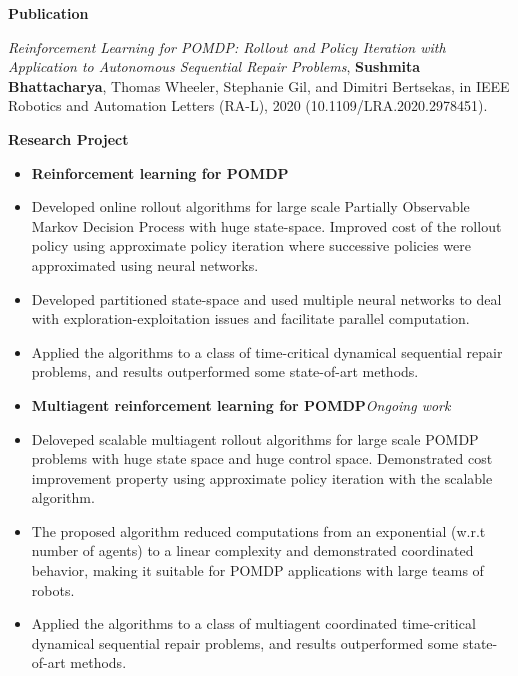 \documentclass[a4paper,11pt]{article}
\newcommand{\resheading}[1]{{\small \colorbox{mygrey}{\begin{minipage}{0.975\textwidth}{\textbf{#1 \vphantom{p\^{E}}}}\end{minipage}}}}
\begin{document}
	
	
	
	\resheading{\textbf{\large Publication}}
	\begin{description}
		\item \hspace{0.65 cm} \textit{Reinforcement Learning for POMDP: Rollout and Policy Iteration with Application to Autonomous Sequential Repair Problems}, \textbf{Sushmita Bhattacharya}, Thomas Wheeler, Stephanie Gil, and Dimitri Bertsekas, in IEEE Robotics and Automation Letters (RA-L), 2020 (10.1109/LRA.2020.2978451).
	\end{description}
	
	
	
	\resheading{\textbf{\large Research Project}}
	\begin{description}
		\item 
		\begin{itemize}
			\item\textbf{Reinforcement learning for POMDP}
			\item Developed online rollout algorithms for large scale Partially Observable Markov Decision Process with huge state-space. Improved cost of the rollout policy using approximate policy iteration where successive policies were approximated using neural networks.
			\item Developed partitioned state-space and used multiple neural networks to deal with exploration-exploitation issues and facilitate parallel computation.
			\item Applied the algorithms to a class of time-critical dynamical sequential repair problems, and results outperformed some state-of-art methods.
			
		\end{itemize}
		\item 
		\begin{itemize}
			\item\textbf{Multiagent reinforcement learning for POMDP}\hfill \textit{Ongoing work}
			\item Deloveped scalable multiagent rollout algorithms for large scale POMDP problems with huge state space and huge control space. Demonstrated cost improvement property using approximate policy iteration with the scalable algorithm.
			\item The proposed algorithm reduced computations from an exponential (w.r.t number of agents) to a linear complexity and demonstrated coordinated behavior, making it suitable for POMDP applications with large teams of robots.
			\item Applied the algorithms to a class of multiagent coordinated time-critical dynamical sequential repair problems, and results outperformed some state-of-art methods.
			
			
		\end{itemize}
	\end{description}
	
\end{document}
